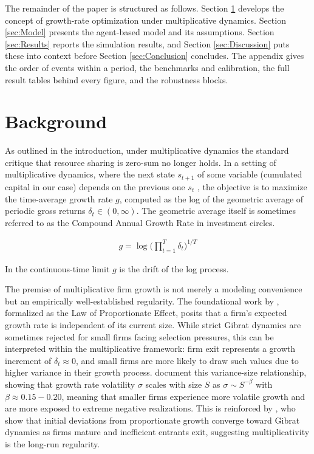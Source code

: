 \documentclass[12pt,a4paper]{article}
\begin{document}
The remainder of the paper is structured as follows. Section \ref{sec:Background} develops the concept of growth-rate optimization under multiplicative dynamics. Section \ref{sec:Model} presents the agent-based model and its assumptions. Section \ref{sec:Results} reports the simulation results, and Section \ref{sec:Discussion} puts these into context before Section \ref{sec:Conclusion} concludes. The appendix gives the order of events within a period, the benchmarks and calibration, the full result tables behind every figure, and the robustness blocks.

\section{Background}
\label{sec:Background}
As outlined in the introduction, under multiplicative dynamics the standard critique that resource sharing is zero-sum no longer holds. In a setting of multiplicative dynamics, where the next state $s_{t+1}$ of some variable (cumulated capital in our case) depends on the previous one $s_t$ \parencite{gibrat1931,sutton1997gibrat}, the objective is to maximize the time-average growth rate $g$, computed as the log of the geometric average of periodic gross returns $\delta_t \in (0, \infty)$. The geometric average itself is sometimes referred to as the Compound Annual Growth Rate in investment circles.

\begin{gather}
    g = \log \Big(\prod_{t=1}^{T} \delta_t \Big)^{1/T}
\end{gather}

In the continuous-time limit $g$ is the drift of the log process.

The premise of multiplicative firm growth is not merely a modeling convenience but an empirically well-established regularity. The foundational work by \textcite{gibrat1931}, formalized as the Law of Proportionate Effect, posits that a firm's expected growth rate is independent of its current size. While strict Gibrat dynamics are sometimes rejected for small firms facing selection pressures, this can be interpreted within the multiplicative framework: firm exit represents a growth increment of $\delta_t \approx 0$, and small firms are more likely to draw such values due to higher variance in their growth process. \textcite{stanley1996scaling} document this variance-size relationship, showing that growth rate volatility  $\sigma$ scales with size $S$ as $\sigma \sim S^{-\beta}$ with $\beta \approx 0.15-0.20$, meaning that smaller firms experience more volatile growth and are more exposed to extreme negative realizations. This is reinforced by \textcite{lotti2009defending}, who show that initial deviations from proportionate growth converge toward Gibrat dynamics as firms mature and inefficient entrants exit, suggesting multiplicativity is the long-run regularity.
\end{document}
